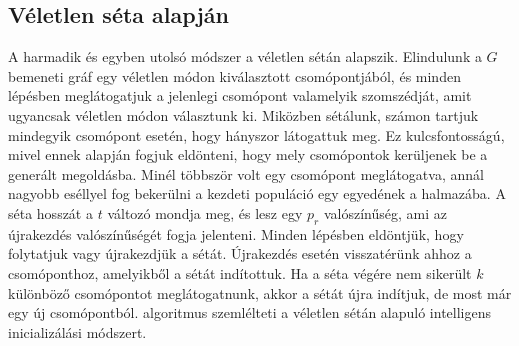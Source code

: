 \subsection{Véletlen séta alapján}
A harmadik és egyben utolsó módszer a véletlen sétán alapszik. Elindulunk a $G$ bemeneti gráf egy véletlen módon kiválasztott csomópontjából, és minden lépésben meglátogatjuk a jelenlegi csomópont valamelyik szomszédját, amit ugyancsak véletlen módon választunk ki.
Miközben sétálunk, számon tartjuk mindegyik csomópont esetén, hogy hányszor látogattuk meg.
Ez kulcsfontosságú, mivel ennek alapján fogjuk eldönteni, hogy mely csomópontok kerüljenek be a generált megoldásba.
Minél többször volt egy csomópont meglátogatva, annál nagyobb eséllyel fog bekerülni a kezdeti populáció egy egyedének a halmazába.
A séta hosszát a $t$ változó mondja meg, és lesz egy $p_r$ valószínűség, ami az újrakezdés valószínűségét fogja jelenteni.
Minden lépésben eldöntjük, hogy folytatjuk vagy újrakezdjük a sétát.
Újrakezdés esetén visszatérünk ahhoz a csomóponthoz, amelyikből a sétát indítottuk.
Ha a séta végére nem sikerült $k$ különböző csomópontot meglátogatnunk, akkor a sétát újra indítjuk, de most már egy új csomópontból.
 algoritmus szemlélteti a véletlen sétán alapuló intelligens inicializálási módszert.

